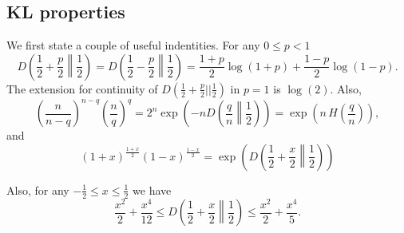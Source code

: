 \subsection{KL properties}
We first state a couple of useful indentities.
For any $ 0\leq p < 1$
\[
D\left(\frac{1}{2}+\frac{p}{2}\middle\|\frac{1}{2}\right) = D\left(\frac{1}{2}-\frac{p}{2}\middle\|\frac{1}{2}\right)= \frac{1+p}{2} \log(1+p) + \frac{1-p}{2} \log(1-p).
\]
The extension for continuity of $D(\frac{1}{2}+\frac{p}{2}||\frac{1}{2})$ in $p=1$ is $\log(2)$.
Also,
\[
\left(\frac{n}{n-q}\right)^{n-q} \left(\frac{n}{q}\right)^{q} = 2^n \exp\left(-n D\left(\frac{q}{n}\middle\|\frac{1}{2}\right)\right)=\exp\left(n\, H\left(\frac{q}{n}\right)\right),
\]
and
\begin{equation}
\label{eq:div_2}
\left(1+x\right)^\frac{1+x}{2} \left(1-x\right)^\frac{1-x}{2}= \exp\left( D\left(\frac{1}{2}+\frac{x}{2}\middle\|\frac{1}{2}\right) \right)
\end{equation}

Also, for any $-\frac{1}{2} \leq x\leq \frac{1}{2}$ we have
\[
\frac{x^2}{2} +\frac{x^4}{12}\leq D\left(\frac{1}{2}+\frac{x}{2}\middle\|\frac{1}{2}\right) \leq \frac{x^2}{2} + \frac{x^4}{5}.
\]
